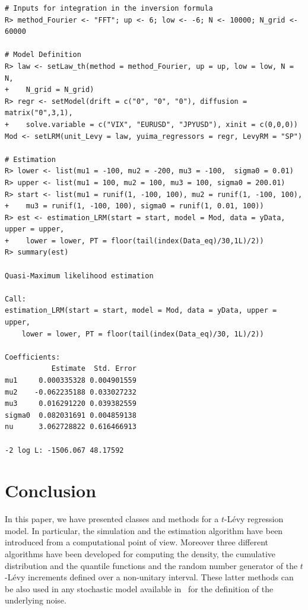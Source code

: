 \begin{verbatim}
# Inputs for integration in the inversion formula
R> method_Fourier <- "FFT"; up <- 6; low <- -6; N <- 10000; N_grid <- 60000

# Model Definition
R> law <- setLaw_th(method = method_Fourier, up = up, low = low, N = N,
+    N_grid = N_grid)
R> regr <- setModel(drift = c("0", "0", "0"), diffusion = matrix("0",3,1),
+    solve.variable = c("VIX", "EURUSD", "JPYUSD"), xinit = c(0,0,0))
Mod <- setLRM(unit_Levy = law, yuima_regressors = regr, LevyRM = "SP")

# Estimation
R> lower <- list(mu1 = -100, mu2 = -200, mu3 = -100,  sigma0 = 0.01)
R> upper <- list(mu1 = 100, mu2 = 100, mu3 = 100, sigma0 = 200.01)
R> start <- list(mu1 = runif(1, -100, 100), mu2 = runif(1, -100, 100),
+    mu3 = runif(1, -100, 100), sigma0 = runif(1, 0.01, 100))
R> est <- estimation_LRM(start = start, model = Mod, data = yData, upper = upper,
+    lower = lower, PT = floor(tail(index(Data_eq)/30,1L)/2))
R> summary(est)

Quasi-Maximum likelihood estimation

Call:
estimation_LRM(start = start, model = Mod, data = yData, upper = upper,
    lower = lower, PT = floor(tail(index(Data_eq)/30, 1L)/2))

Coefficients:
           Estimate  Std. Error
mu1     0.000335328 0.004901559
mu2    -0.062235188 0.033027232
mu3     0.016291220 0.039382559
sigma0  0.082031691 0.004859138
nu      3.062728822 0.616466913

-2 log L: -1506.067 48.17592
\end{verbatim}

\section{Conclusion}\label{concl}

In this paper, we have presented classes and methods for a \(t\)-Lévy regression model. In particular, the simulation and the estimation algorithm have been introduced from a computational point of view. Moreover three different algorithms have been developed for computing the density, the cumulative distribution and the quantile functions and the random number generator of the \(t\)-Lévy increments defined over a non-unitary interval. These latter methods can be also used in any stochastic model available in  ~for the definition of the underlying noise.

